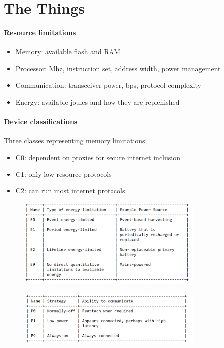 \documentclass[11pt]{article}
\begin{document}
    \section{The Things}

    \paragraph{Resource limitations}
    \begin{itemize}
    \item Memory: available flash and RAM
    \item Processor: Mhz, instruction set, address width, power management
    \item Communication: transceiver power, bps, protocol complexity
    \item Energy: available joules and how they are replenished
    \end{itemize}

    \paragraph{Device classifications}
    Three classes representing memory limitations:
    \begin{itemize}
        \item C0: dependent on proxies for secure internet inclusion
        \item C1: only low resource protocols
        \item C2: can run most internet protocols
    \end{itemize}

    \begin{figure}[H]
        \centering
        \includegraphics[width=0.8\textwidth]{img/paste-20201117123757.png}
    \end{figure}

    \begin{figure}[H]
        \centering
        \includegraphics[width=0.8\textwidth]{img/paste-20201117123806.png}
    \end{figure}
\end{document}
